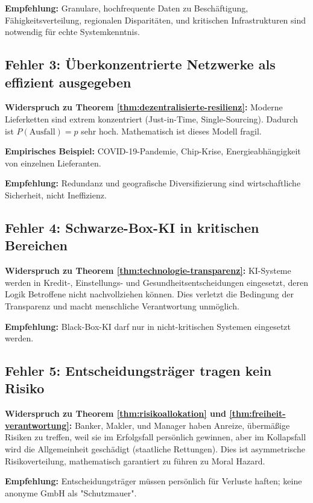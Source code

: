 \documentclass[a4paper, 12pt, twoside, openright]{report}
\theoremstyle{definition}
\theoremstyle{definition}
\begin{document}
\textbf{Empfehlung:} Granulare, hochfrequente Daten zu Beschäftigung, Fähigkeitsverteilung, regionalen Disparitäten, und kritischen Infrastrukturen sind notwendig für echte Systemkenntnis.

\subsection{Fehler 3: Überkonzentrierte Netzwerke als effizient ausgegeben}

\textbf{Widerspruch zu Theorem \ref{thm:dezentralisierte-resilienz}:}
Moderne Lieferketten sind extrem konzentriert (Just-in-Time, Single-Sourcing). Dadurch ist $P(\text{Ausfall}) = p$ sehr hoch. Mathematisch ist dieses Modell fragil.

\textbf{Empirisches Beispiel:} COVID-19-Pandemie, Chip-Krise, Energieabhängigkeit von einzelnen Lieferanten.

\textbf{Empfehlung:} Redundanz und geografische Diversifizierung sind wirtschaftliche Sicherheit, nicht Ineffizienz.

\subsection{Fehler 4: Schwarze-Box-KI in kritischen Bereichen}

\textbf{Widerspruch zu Theorem \ref{thm:technologie-transparenz}:}
KI-Systeme werden in Kredit-, Einstellungs- und Gesundheitsentscheidungen eingesetzt, deren Logik Betroffene nicht nachvollziehen können. Dies verletzt die Bedingung der Transparenz und macht menschliche Verantwortung unmöglich.

\textbf{Empfehlung:} Black-Box-KI darf nur in nicht-kritischen Systemen eingesetzt werden.

\subsection{Fehler 5: Entscheidungsträger tragen kein Risiko}

\textbf{Widerspruch zu Theorem \ref{thm:risikoallokation} und \ref{thm:freiheit-verantwortung}:}
Banker, Makler, und Manager haben Anreize, übermäßige Risiken zu treffen, weil sie im Erfolgsfall persönlich gewinnen, aber im Kollapsfall wird die Allgemeinheit geschädigt (staatliche Rettungen). Dies ist asymmetrische Risikoverteilung, mathematisch garantiert zu führen zu Moral Hazard.

\textbf{Empfehlung:} Entscheidungsträger müssen persönlich für Verluste haften; keine anonyme GmbH als "Schutzmauer".
\end{document}
